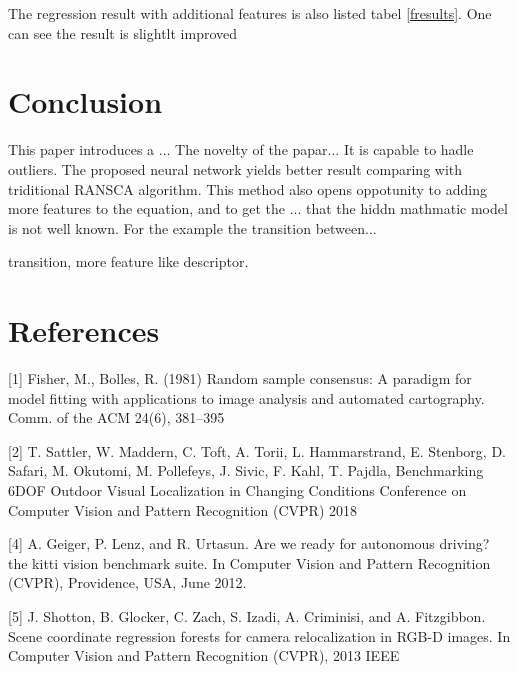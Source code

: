 \documentclass{article}
\begin{document}
The regression result with additional features is also listed tabel \ref{fresults}. One can see the result is slightlt improved

\section{Conclusion}


This paper introduces a ... The novelty of the papar... It is capable to hadle outliers. The proposed neural network yields better result comparing with triditional RANSCA algorithm. This method also opens oppotunity to adding more features to the equation, and to get the ... that the hiddn mathmatic model is not well known.  For the example the transition between...

transition, more feature like descriptor.



\section*{References}

\medskip

[1] Fisher, M., Bolles, R. (1981) Random sample consensus: A paradigm for model fitting with applications to image analysis and automated cartography. Comm. of the ACM 24(6), 381–395

[2] T. Sattler, W. Maddern, C. Toft, A. Torii, L. Hammarstrand, E. Stenborg, D. Safari, M. Okutomi, M. Pollefeys, J. Sivic, F. Kahl, T. Pajdla, Benchmarking 6DOF Outdoor Visual Localization in Changing Conditions Conference on Computer Vision and Pattern Recognition (CVPR) 2018



[4] A. Geiger, P. Lenz, and R. Urtasun. Are we ready for autonomous
driving? the kitti vision benchmark suite. In Computer
Vision and Pattern Recognition (CVPR), Providence,
USA, June 2012.

[5] J. Shotton, B. Glocker, C. Zach, S. Izadi, A. Criminisi, and A. Fitzgibbon. Scene coordinate regression forests for camera relocalization in RGB-D images. In Computer Vision and Pattern Recognition (CVPR), 2013 IEEE
\end{document}
